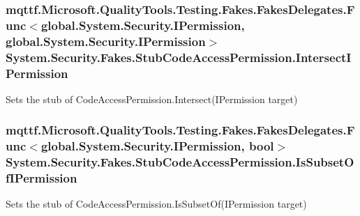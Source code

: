\hypertarget{class_system_1_1_security_1_1_fakes_1_1_stub_code_access_permission_a226f07de77bf797f8ccd023b75db9be9}{
\subsubsection[{Intersect\-I\-Permission}]{\setlength{\rightskip}{0pt plus 5cm}mqttf.\-Microsoft.\-Quality\-Tools.\-Testing.\-Fakes.\-Fakes\-Delegates.\-Func$<$global.\-System.\-Security.\-I\-Permission, global.\-System.\-Security.\-I\-Permission$>$ System.\-Security.\-Fakes.\-Stub\-Code\-Access\-Permission.\-Intersect\-I\-Permission}}\label{class_system_1_1_security_1_1_fakes_1_1_stub_code_access_permission_a226f07de77bf797f8ccd023b75db9be9}


Sets the stub of Code\-Access\-Permission.\-Intersect(\-I\-Permission target)

\hypertarget{class_system_1_1_security_1_1_fakes_1_1_stub_code_access_permission_a0c5ea628a5111e3cb304769ea12e5bf5}{
\subsubsection[{Is\-Subset\-Of\-I\-Permission}]{\setlength{\rightskip}{0pt plus 5cm}mqttf.\-Microsoft.\-Quality\-Tools.\-Testing.\-Fakes.\-Fakes\-Delegates.\-Func$<$global.\-System.\-Security.\-I\-Permission, bool$>$ System.\-Security.\-Fakes.\-Stub\-Code\-Access\-Permission.\-Is\-Subset\-Of\-I\-Permission}}\label{class_system_1_1_security_1_1_fakes_1_1_stub_code_access_permission_a0c5ea628a5111e3cb304769ea12e5bf5}


Sets the stub of Code\-Access\-Permission.\-Is\-Subset\-Of(\-I\-Permission target)

